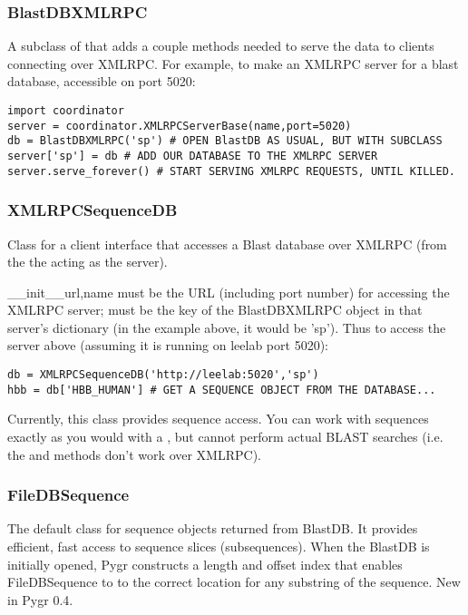 \documentclass{howto}
\begin{document}
\subsubsection{BlastDBXMLRPC}
A subclass of  that adds a couple methods needed to serve
the data to clients connecting over XMLRPC.  For example, to make an XMLRPC
server for a blast database, accessible on port 5020:
\begin{verbatim}
import coordinator
server = coordinator.XMLRPCServerBase(name,port=5020)
db = BlastDBXMLRPC('sp') # OPEN BlastDB AS USUAL, BUT WITH SUBCLASS
server['sp'] = db # ADD OUR DATABASE TO THE XMLRPC SERVER
server.serve_forever() # START SERVING XMLRPC REQUESTS, UNTIL KILLED.
\end{verbatim}

\subsubsection{XMLRPCSequenceDB}
Class for a client interface that accesses a Blast database over
XMLRPC (from the the  acting as the server).
\begin{funcdesc}{__init__}{url,name}
   must be the URL (including port number) for accessing the 
  XMLRPC server;  must be the key of the BlastDBXMLRPC object
  in that server's dictionary (in the example above, it would be 'sp').
  Thus to access the server above (assuming it is running on leelab port 5020):
\begin{verbatim}
db = XMLRPCSequenceDB('http://leelab:5020','sp')
hbb = db['HBB_HUMAN'] # GET A SEQUENCE OBJECT FROM THE DATABASE...
\end{verbatim}
\end{funcdesc}
Currently, this class provides sequence access.  You can work with sequences
exactly as you would with a , but cannot perform actual BLAST searches
(i.e. the  and  methods don't work over XMLRPC).

\subsubsection{FileDBSequence}
The default class for sequence objects returned from BlastDB.  It provides efficient,
fast access to sequence slices (subsequences).  When the BlastDB is initially opened,
Pygr constructs a length and offset index that enables FileDBSequence to 
to the correct location for any substring of the sequence.  New in Pygr 0.4.
\end{document}
